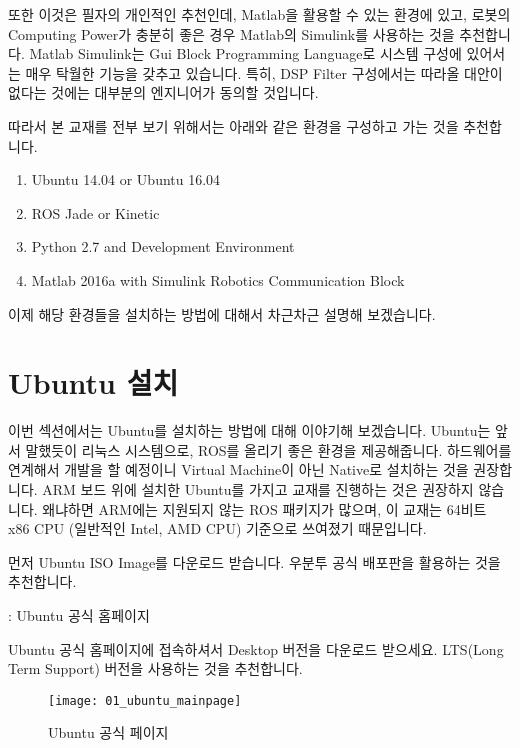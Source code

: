 \documentclass[11pt,fleqn]{book} %
\begin{document}
또한 이것은 필자의 개인적인 추천인데, Matlab을 활용할 수 있는 환경에 있고, 로봇의 Computing Power가 충분히 좋은 경우 Matlab의 Simulink를 사용하는 것을 추천합니다.
Matlab Simulink는 Gui Block Programming Language로 시스템 구성에 있어서는 매우 탁월한 기능을 갖추고 있습니다.
특히, DSP Filter 구성에서는 따라올 대안이 없다는 것에는 대부분의 엔지니어가 동의할 것입니다.

따라서 본 교재를 전부 보기 위해서는 아래와 같은 환경을 구성하고 가는 것을 추천합니다.

\begin{enumerate}
\item Ubuntu 14.04 or Ubuntu 16.04
\item ROS Jade or Kinetic
\item Python 2.7 and Development Environment
\item Matlab 2016a with Simulink Robotics Communication Block
\end{enumerate}

이제 해당 환경들을 설치하는 방법에 대해서 차근차근 설명해 보겠습니다.


\section{Ubuntu 설치}
\label{sec:Ubuntu 설치}

이번 섹션에서는 Ubuntu를 설치하는 방법에 대해 이야기해 보겠습니다. Ubuntu는 앞서 말했듯이 리눅스 시스템으로,
ROS를 올리기 좋은 환경을 제공해줍니다. 하드웨어를 연계해서 개발을 할 예정이니 Virtual Machine이 아닌 Native로 설치하는 것을 권장합니다.
ARM 보드 위에 설치한 Ubuntu를 가지고 교재를 진행하는 것은 권장하지 않습니다. 왜냐하면 ARM에는 지원되지 않는 ROS 패키지가 많으며, 이 교재는 64비트 x86 CPU (일반적인 Intel, AMD CPU) 기준으로 쓰여졌기 때문입니다.

먼저 Ubuntu ISO Image를 다운로드 받습니다. 우분투 공식 배포판을 활용하는 것을 추천합니다.

\begin{link}
  : Ubuntu 공식 홈페이지
\end{link}

 Ubuntu 공식 홈페이지에 접속하셔서 Desktop 버전을 다운로드 받으세요. LTS(Long Term Support) 버전을 사용하는 것을 추천합니다.


\begin{figure}[h]
\centering\texttt{[image: 01\_ubuntu\_mainpage]}
\caption{Ubuntu 공식 페이지}
\end{figure}
\end{document}

